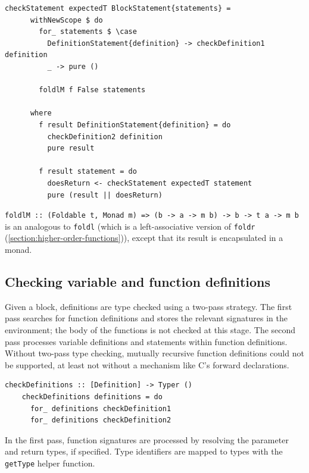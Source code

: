 \documentclass[UdineBachThesis,american,11pt]{PhdThesis}
\begin{document}
  \begin{Verbatim}[gobble=4,fontsize=\small]
    checkStatement expectedT BlockStatement{statements} =
      withNewScope $ do
        for_ statements $ \case
          DefinitionStatement{definition} -> checkDefinition1 definition
          _ -> pure ()

        foldlM f False statements

      where
        f result DefinitionStatement{definition} = do
          checkDefinition2 definition
          pure result

        f result statement = do
          doesReturn <- checkStatement expectedT statement
          pure (result || doesReturn)
  \end{Verbatim}

  \mbox{\texttt{foldlM :: (Foldable t, Monad m) => (b -> a -> m b) -> b -> t a -> m b}}
  is an analogous to \mbox{\texttt{foldl}} (which is a left-associative version
  of \mbox{\texttt{foldr}} (\autoref{section:higher-order-functions})), except
  that its result is encapsulated in a monad.

  \subsection{Checking variable and function definitions}

  Given a block, definitions are type checked using a two-pass strategy. The
  first pass searches for function definitions and stores the relevant
  signatures in the environment; the body of the functions is not checked at
  this stage. The second pass processes variable definitions and statements
  within function definitions. Without two-pass type checking, mutually
  recursive function definitions could not be supported, at least not without a
  mechanism like C's forward declarations.

  \begin{Verbatim}[gobble=4,fontsize=\small]
    checkDefinitions :: [Definition] -> Typer ()
    checkDefinitions definitions = do
      for_ definitions checkDefinition1
      for_ definitions checkDefinition2
  \end{Verbatim}

  In the first pass, function signatures are processed by resolving the
  parameter and return types, if specified. Type identifiers are mapped to types
  with the \mbox{\texttt{getType}} helper function.
\end{document}
